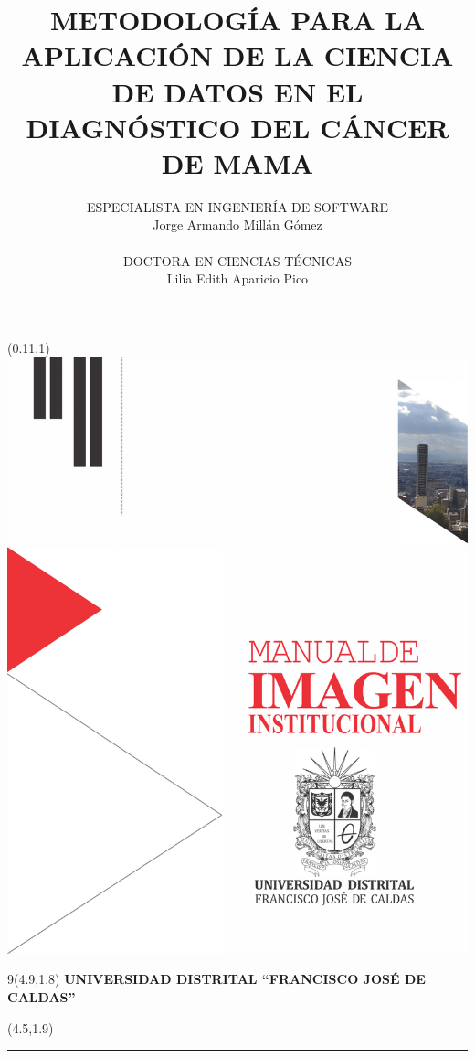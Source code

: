 \documentclass[openany,12pt,letterpaper]{book}
\title{\Large{\textbf{METODOLOGÍA PARA LA APLICACIÓN DE LA CIENCIA DE DATOS EN EL DIAGNÓSTICO DEL CÁNCER DE MAMA}}}
\author{
	\large{ESPECIALISTA EN INGENIERÍA DE SOFTWARE}\\ \Large{Jorge Armando Millán Gómez} \\ \\ \large{DOCTORA EN CIENCIAS TÉCNICAS} \\ \Large{Lilia Edith Aparicio Pico} }
\begin{document}
	
\maketitle
\thispagestyle{empty}


\thispagestyle{empty}
\begin{textblock}{6}(0.11,1)
	\includegraphics[scale=0.95]{IMAGENES/LogoUdistrital}
\end{textblock}

\begin{center}	
	\begin{textblock} {9}(4.9,1.8)
		\Large{\textbf{UNIVERSIDAD DISTRITAL ``FRANCISCO JOSÉ DE CALDAS''}}
	\end{textblock}
\end{center}

\begin{textblock}{10}(4.5,1.9) 
	
	\begin{flushleft}
		\rule{13.5cm}{1.0mm}
	\end{flushleft}
\end{textblock}
\end{document}
